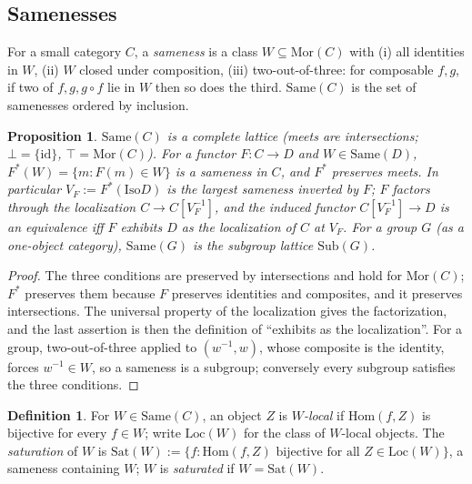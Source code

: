 \documentclass[11pt]{amsart}
\newtheorem{prop}[thm]{Proposition}
\theoremstyle{definition}
\newtheorem{defi}[thm]{Definition}
\newcommand{\Same}{\mathrm{Same}}
\newcommand{\Sub}{\mathrm{Sub}}
\newcommand{\Mor}{\mathrm{Mor}}
\newcommand{\Iso}{\mathrm{Iso}}
\begin{document}
\subsection{Samenesses}
For a small category $C$, a \emph{sameness} is a class $W\subseteq\Mor(C)$
with (i) all identities in $W$, (ii) $W$ closed under composition, (iii)
two-out-of-three: for composable $f,g$, if two of $f,g,g\circ f$ lie in $W$ then
so does the third. $\Same(C)$ is the set of samenesses ordered by inclusion.

\begin{prop}\label{prop:same}
$\Same(C)$ is a complete lattice (meets are intersections; $\bot=\{\mathrm{id}\}$,
$\top=\Mor(C)$). For a functor $F\colon C\to D$ and $W\in\Same(D)$,
$F^*(W)=\{m:F(m)\in W\}$ is a sameness in $C$, and $F^*$ preserves meets. In
particular $V_F:=F^*(\Iso D)$ is the largest sameness inverted by $F$; $F$
factors through the localization $C\to C[V_F^{-1}]$, and the induced functor
$C[V_F^{-1}]\to D$ is an equivalence iff $F$ exhibits $D$ as the localization
of $C$ at $V_F$. For a group $G$ (as a one-object category), $\Same(G)$ is the
subgroup lattice $\Sub(G)$.
\end{prop}
\begin{proof}
The three conditions are preserved by intersections and hold for $\Mor(C)$;
$F^*$ preserves them because $F$ preserves identities and composites, and it
preserves intersections. The universal property of the localization
\cite[I.1]{GZ} gives the factorization, and the last assertion is then the
definition of ``exhibits as the localization''. For a group, two-out-of-three
applied to $(w^{-1},w)$, whose composite is the identity, forces $w^{-1}\in W$,
so a sameness is a subgroup; conversely every subgroup satisfies the three
conditions.
\end{proof}

\begin{defi}\label{def:sat}
For $W\in\Same(C)$, an object $Z$ is \emph{$W$-local} if $\mathrm{Hom}(f,Z)$
is bijective for every $f\in W$; write $\mathrm{Loc}(W)$ for the class of
$W$-local objects. The \emph{saturation} of $W$ is
$\mathrm{Sat}(W):=\{f:\mathrm{Hom}(f,Z)\text{ bijective for all }Z\in
\mathrm{Loc}(W)\}$, a sameness containing $W$; $W$ is \emph{saturated} if
$W=\mathrm{Sat}(W)$.
\end{defi}
\end{document}
